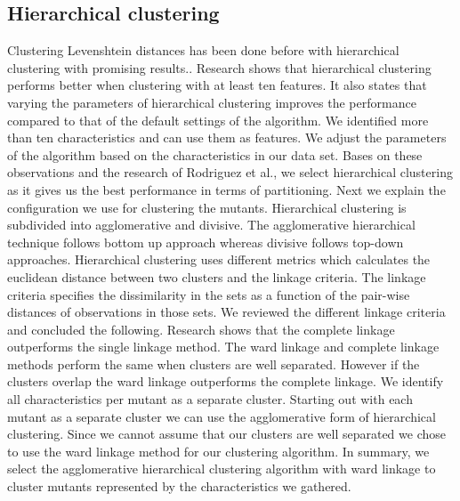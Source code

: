 \documentclass[conference,draftclsnofoot,onecolumn]{IEEEtran}
\begin{document}
\subsection{Hierarchical clustering}
Clustering Levenshtein distances has been done before with hierarchical clustering with promising results.\cite{Rajalingam2011, Gothai2010PerformanceAlgorithms}. 
Research shows that hierarchical clustering performs better when clustering with at least ten features\cite{Rodriguez2019}.
It also states that varying the parameters of hierarchical clustering improves the performance compared to that of the default settings of the algorithm\cite{Rodriguez2019}.
We identified more than ten characteristics and can use them as features.
We adjust the parameters of the algorithm based on the characteristics in our data set.
Bases on these observations and the research of Rodriguez et al., we select hierarchical clustering as it gives us the best performance in terms of partitioning.
\newline
Next we explain the configuration we use for clustering the mutants. 
Hierarchical clustering is subdivided into agglomerative and divisive. 
The agglomerative hierarchical technique follows bottom up approach whereas divisive follows top-down approaches.
Hierarchical clustering uses different metrics which calculates the euclidean distance between two clusters and the linkage criteria\cite{Rajalingam2011}. 
The linkage criteria specifies the dissimilarity in the sets as a function of the pair-wise distances of observations in those sets\cite{Rajalingam2011}.
We reviewed the different linkage criteria and concluded the following.
\newline
Research shows that the complete linkage outperforms the single linkage method\cite{Vijaya2019ComparativeClustering}.
The ward linkage and complete linkage methods perform the same when clusters are well separated\cite{Vijaya2019ComparativeClustering}.
However if the clusters overlap the ward linkage outperforms the complete linkage\cite{Vijaya2019ComparativeClustering}.
\newline
We identify all characteristics per mutant as a separate cluster.
Starting out with each mutant as a separate cluster we can use the agglomerative form of hierarchical clustering.
Since we cannot assume that our clusters are well separated we chose to use the ward linkage method for our clustering algorithm.
In summary, we select the agglomerative hierarchical clustering algorithm with ward linkage to cluster mutants represented by the characteristics we gathered.
\end{document}
